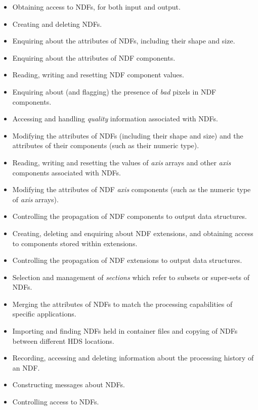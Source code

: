 \documentclass[twoside,11pt,nolof]{starlink}
\providecommand{\st}[1]{{\emph{#1}}}
\begin{document}
\begin{itemize}
\item
Obtaining access to NDFs, for both input and output.

\item
Creating and deleting NDFs.

\item
Enquiring about the attributes of NDFs, including their shape and size.

\item
Enquiring about the attributes of NDF components.

\item
Reading, writing and resetting NDF component values.

\item
Enquiring about (and flagging) the presence of \st{bad\/} pixels in NDF
components.

\item
Accessing and handling \st{quality\/} information associated with NDFs.

\item
Modifying the attributes of NDFs (including their shape and size) and the
attributes of their components (such as their numeric type).

\item
Reading, writing and resetting the values of \st{axis\/} arrays and other
\st{axis\/} components associated with NDFs.

\item
Modifying the attributes of NDF \st{axis} components (such as the numeric
type of \st{axis\/} arrays).

\item
Controlling the propagation of NDF components to output data structures.

\item
Creating, deleting and enquiring about NDF extensions, and obtaining access
to components stored within extensions.

\item
Controlling the propagation of NDF extensions to output data structures.

\item
Selection and management of \st{sections\/} which refer to subsets or
super-sets of NDFs.

\item
Merging the attributes of NDFs to match the processing capabilities of
specific applications.

\item
Importing and finding NDFs held in  container files
and copying of NDFs between different HDS locations.

\item
Recording, accessing and deleting information about the processing
history of an NDF.

\item
Constructing messages about NDFs.

\item
Controlling access to NDFs.

\end{itemize}
\end{document}
